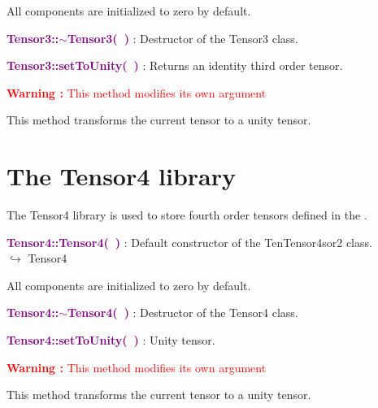 All components are initialized to zero by default.

\textcolor{purple}{\textbf{Tensor3::$\sim$Tensor3(~)}}\label{Tensor3::~Tensor3()} : Destructor of the Tensor3 class.


\textcolor{purple}{\textbf{Tensor3::setToUnity(~)}}\label{Tensor3::setToUnity()} : Returns an identity third order tensor.

\hspace*{10mm}\textcolor{red}{\textbf{Warning :} This method modifies its own argument}

This method transforms the current tensor to a unity tensor.

\section{The Tensor4 library}

The Tensor4 library is used to store fourth order tensors defined in the \DynELA.

\textcolor{purple}{\textbf{Tensor4::Tensor4(~)}}\label{Tensor4::Tensor4()} : Default constructor of the TenTensor4sor2 class.\\ \hspace*{5mm}$\hookrightarrow$ Tensor4

All components are initialized to zero by default.

\textcolor{purple}{\textbf{Tensor4::$\sim$Tensor4(~)}}\label{Tensor4::~Tensor4()} : Destructor of the Tensor4 class.


\textcolor{purple}{\textbf{Tensor4::setToUnity(~)}}\label{Tensor4::setToUnity()} : Unity tensor.

\hspace*{10mm}\textcolor{red}{\textbf{Warning :} This method modifies its own argument}

This method transforms the current tensor to a unity tensor.
